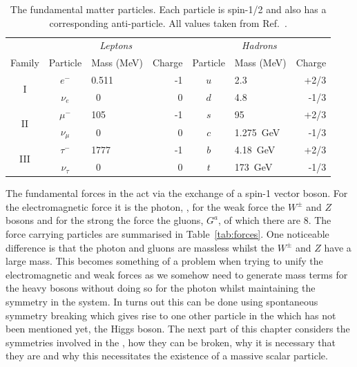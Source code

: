 \begin{table}[htb]
  \begin{tabular}{c | c l r | c l r }
  & \multicolumn{3}{c}{\textit{Leptons}} & \multicolumn{3}{c}{\textit{Hadrons}} \\
  Family & Particle      & Mass (MeV)  & Charge &  Particle      & Mass (MeV)  & Charge   \\
  \hline
  \multirow{2}{*}{I}    & $e^{-}$       & 0.511       & -1     &  $u$           & 2.3       & +2/3      \\
                        & $\nu_{e}$     & ~0          & 0      &  $d$           & 4.8         & -1/3       \\
  \multirow{2}{*}{II}   & $\mu^{-}$     & 105         & -1     &  $s$           & 95         & +2/3      \\
                        & $\nu_{\mu}$   & ~0          & 0      &  $c$           & 1.275~GeV          & -1/3       \\
  \multirow{2}{*}{III}  & $\tau^{-}$    & 1777        & -1     &  $b$           & 4.18~GeV        & +2/3      \\
                        & $\nu_{\tau}$  & ~0          & 0      &  $t$           & 173~GeV          & -1/3       \\
  \end{tabular}
  \caption{The fundamental matter particles. Each particle is spin-1/2 and also has a corresponding anti-particle. All values taken from Ref.~\cite{pdg}.}
  \label{tab:particles}
\end{table}

The fundamental forces in the \SM act via the exchange of a spin-1 vector boson. For the electromagnetic force it is the photon, \gamma, for the weak force the $W^{\pm}$ and $Z$ bosons and for the strong the force the gluons, $G^{a}$, of which there are 8. The force carrying particles are summarised in Table~\ref{tab:forces}. One noticeable difference is that the photon and gluons are massless whilst the $W^{\pm}$ and $Z$ have a large mass. This becomes something of a problem when trying to unify the electromagnetic and weak forces as we somehow need to generate mass terms for the heavy bosons without doing so for the photon whilst maintaining the symmetry in the system. In turns out this can be done using spontaneous symmetry breaking which gives rise to one other particle in the \SM which has not been mentioned yet, the Higgs boson. The next part of this chapter considers the symmetries involved in the \SM, how they can be broken, why it is necessary that they are and why this necessitates the existence of a massive scalar particle.

